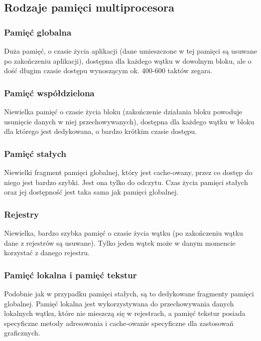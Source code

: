 \documentclass[a4paper,twoside]{article}
\begin{document}
\subsection{Rodzaje pamięci multiprocesora}
\subsubsection{Pamięć globalna}
Duża pamięć, o czasie życia aplikacji (dane umieszczone w tej pamięci są usuwane po zakończeniu aplikacji), dostępna dla każdego wątku w dowolnym bloku, ale o dość długim czasie dostępu wynoszącym ok. 400-600 taktów zegara.
\subsubsection{Pamięć współdzielona}
Niewielka pamięć o czasie życia bloku (zakończenie działania bloku powoduje usunięcie danych w niej przechowywanych), dostępna dla każdego wątku w bloku dla którego jest dedykowana, o bardzo krótkim czasie dostępu.
\subsubsection{Pamięć stałych}
Niewielki fragment pamięci globalnej, który jest cache-owany, przez co dostęp do niego jest bardzo szybki. Jest ona tylko do odczytu. Czas życia pamięci stałych oraz jej dostępność jest taka sama jak pamięci globalnej.
\subsubsection{Rejestry}
Niewielka, bardzo szybka pamięć o czasie życia wątku (po zakończeniu wątku dane z rejestrów są usuwane). Tylko jeden wątek może w danym momencie korzystać z danego rejestru.
\subsubsection{Pamięć lokalna i pamięć tekstur}
Podobnie jak w przypadku pamięci stałych, są to dedykowane fragmenty pamięci globalnej. Pamięć lokalna jest wykorzystywana do przechowywania danych lokalnych wątku, które nie mieszczą się w rejestrach, a pamięć tekstur posiada specyficzne metody adresowania i cache-owanie specyficzne dla zastosowań graficznych.
\vfill
\end{document}
